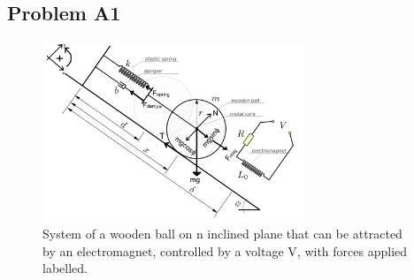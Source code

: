 \subsection*{Problem A1}
\hfill \break
\begin{figure}[h!]
  \includegraphics[width=0.7\textwidth]{Report/figures/main_diagram}
  \caption{System of a wooden ball on n inclined plane that can be attracted by an electromagnet, controlled by a voltage V, with forces applied labelled.}
  \label{fig:system}
\end{figure}

